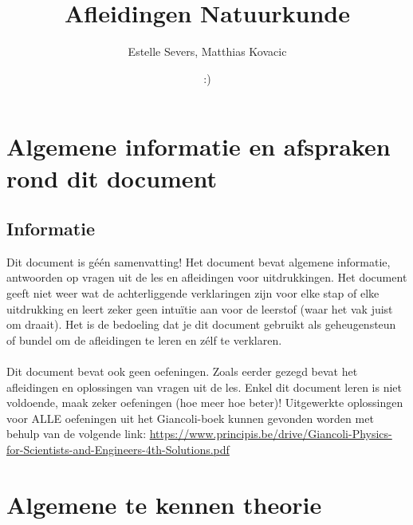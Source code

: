 \documentclass[12pt,a4paper]{article}
\author{Estelle Severs, Matthias Kovacic}
\title{Afleidingen Natuurkunde}
\date{:)}
\begin{document}
    \maketitle
    \tableofcontents
    \newpage


    \section{Algemene informatie en afspraken rond dit document}
    \subsection{Informatie}
    Dit document is géén samenvatting! Het document bevat algemene informatie, antwoorden
    op vragen uit de les en afleidingen voor uitdrukkingen. Het document geeft niet weer wat de 
    achterliggende verklaringen zijn voor elke stap of elke uitdrukking en leert zeker geen intuïtie
    aan voor de leerstof (waar het vak juist om draait). Het is de bedoeling dat je dit document
    gebruikt als geheugensteun of bundel om de afleidingen te leren en zélf te verklaren. \\
    \\
    Dit document bevat ook geen oefeningen. Zoals eerder gezegd bevat het afleidingen en oplossingen
    van vragen uit de les. Enkel dit document leren is niet voldoende, maak zeker oefeningen (hoe meer
    hoe beter)! Uitgewerkte oplossingen voor ALLE oefeningen uit het Giancoli-boek kunnen gevonden worden met behulp 
    van de volgende link: \url{https://www.principis.be/drive/Giancoli-Physics-for-Scientists-and-Engineers-4th-Solutions.pdf}

    \section{Algemene te kennen theorie}
\end{document}
